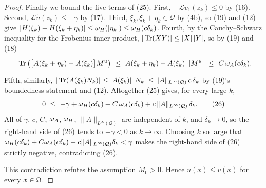 \begin{proof}
Finally we bound the five terms of (25). First, $-\mathcal Lv_1(z_k)\le0$ by (16). Second,
$\mathcal L\tilde u(z_k)\le-\gamma$ by (17). Third, $\xi_k,\xi_k+\eta_k\in\mathcal Q$ by
(4b), so (19) and (12) give
$|H(\xi_k)-H(\xi_k+\eta_k)|\le\omega_H(|\eta_k|)\le\omega_H(c\delta_k)$. Fourth, by the
Cauchy--Schwarz inequality for the Frobenius inner product,
$|\operatorname{Tr}(XY)|\le|X|\,|Y|$, so by (19) and (18)
\[
 \Big|\Tr\big(\big[A(\xi_k+\eta_k)-A(\xi_k)\big]M^{u}\big)\Big|
 \le\big|A(\xi_k+\eta_k)-A(\xi_k)\big|\,|M^{u}|\ \le\ C\,\om_A(c\delta_k).
\]
Fifth, similarly, $|\operatorname{Tr}(A(\xi_k)N_k)|\le|A(\xi_k)|\,|N_k|\le\|A\|_{L^\infty(\mathcal Q)}\,c\,\delta_k$
by (19)'s boundedness statement and (12). Altogether (25) gives, for every large $k$,
\[
 0\ \le\ -\gamma+\om_H(c\delta_k)+C\,\om_A(c\delta_k)
 +c\,\|A\|_{L^\infty(\mathcal Q)}\,\delta_k . \tag{26}
\]
All of $\gamma$, $c$, $C$, $\omega_A$, $\omega_H$, $\|A\|_{L^\infty(\mathcal Q)}$ are
independent of $k$, and $\delta_k\to0$, so the right-hand side of (26) tends to
$-\gamma<0$ as $k\to\infty$. Choosing $k$ so large that
$\omega_H(c\delta_k)+C\omega_A(c\delta_k)+c\|A\|_{L^\infty(\mathcal Q)}\delta_k<\gamma$ makes the
right-hand side of (26) strictly negative, contradicting (26).

This contradiction refutes the assumption $M_0>0$. Hence $u(x)\le v(x)$ for every
$x\in\Omega$.
\end{proof}

